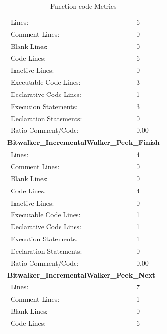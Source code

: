 \begin{longtable}{||p{}|p{}||}
  \caption{Function code Metrics}\\
    \hline\hline
    \endhead
    \hline\hline
    \endfoot
    \multicolumn{2}{||l||}{\textbf{Bitwalker\_IncrementalWalker\_Init}}
\\\hline
    \ Lines: & 6
    \\
    \hline
    \ Comment Lines: & 0
    \\
    \hline
    \ Blank Lines: & 0
    \\
    \hline
    \ Code Lines:  & 6
    \\
    \hline
    \ Inactive Lines:  & 0
    \\
    \hline
    \ Executable Code Lines:  & 3
    \\
    \hline
    \ Declarative Code Lines:  & 1
    \\
    \hline
    \ Execution Statements:  & 3
    \\
    \hline
    \ Declaration Statements:  & 0
    \\
    \hline
    \ Ratio Comment/Code:  & 0.00
    \\
    \hline
    \multicolumn{2}{||l||}{\textbf{Bitwalker\_IncrementalWalker\_Peek\_Finish}}
\\\hline
    \ Lines: & 4
    \\
    \hline
    \ Comment Lines: & 0
    \\
    \hline
    \ Blank Lines: & 0
    \\
    \hline
    \ Code Lines:  & 4
    \\
    \hline
    \ Inactive Lines:  & 0
    \\
    \hline
    \ Executable Code Lines:  & 1
    \\
    \hline
    \ Declarative Code Lines:  & 1
    \\
    \hline
    \ Execution Statements:  & 1
    \\
    \hline
    \ Declaration Statements:  & 0
    \\
    \hline
    \ Ratio Comment/Code:  & 0.00
    \\
    \hline
    \multicolumn{2}{||l||}{\textbf{Bitwalker\_IncrementalWalker\_Peek\_Next}}
\\\hline
    \ Lines: & 7
    \\
    \hline
    \ Comment Lines: & 1
    \\
    \hline
    \ Blank Lines: & 0
    \\
    \hline
    \ Code Lines:  & 6

\end{longtable}
